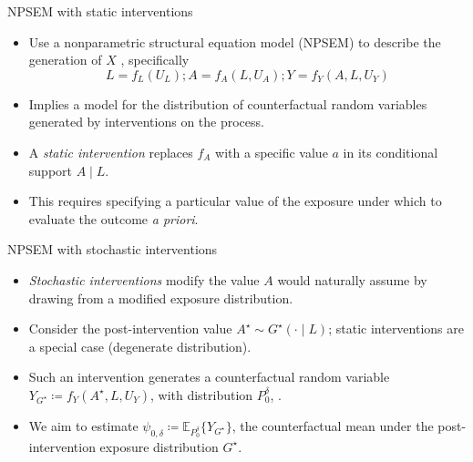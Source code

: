 \documentclass{beamer}
\newcommand{\E}{\mathbb{E}}
\begin{document}

\begin{frame}[c]{NPSEM with static interventions}

\begin{center}
\begin{itemize}
  \itemsep10pt
  \item Use a nonparametric structural equation model (NPSEM) to describe the
    generation of $X$ \citep{pearl2009causality}, specifically
    \begin{equation*}
      L = f_L(U_L); A = f_A(L, U_A); Y = f_Y(A, L, U_Y)
    \end{equation*}
  \item Implies a model for the distribution of counterfactual random variables
    generated by interventions on the process.
  \item A \textit{static intervention} replaces $f_A$ with a specific value $a$
    in its conditional support $A \mid L$.
  \item This requires specifying a particular value of the exposure under which
    to evaluate the outcome \textit{a priori}.
\end{itemize}
\end{center}

\note{
}

\end{frame}


\begin{frame}[c]{NPSEM with stochastic interventions}

\begin{center}
\begin{itemize}
  \itemsep10pt
  \item \textit{Stochastic interventions} modify the value $A$ would naturally
    assume by drawing from a modified exposure distribution.
  \item Consider the post-intervention value $A^{\star} \sim G^{\star}(\cdot
    \mid L)$; static interventions are a special case (degenerate distribution).
  \item Such an intervention generates a counterfactual random variable
    $Y_{G^{\star}} \coloneqq f_Y(A^{\star}, L, U_Y)$, with distribution
    $P_0^{\delta}$, .
  \item We aim to estimate $\psi_{0,\delta} \coloneqq \E_{P_0^{\delta}}
    \{Y_{G^{\star}}\}$, the counterfactual mean under the post-intervention
    exposure distribution $G^{\star}$.
\end{itemize}
\end{center}

\note{
}

\end{frame}
\end{document}
